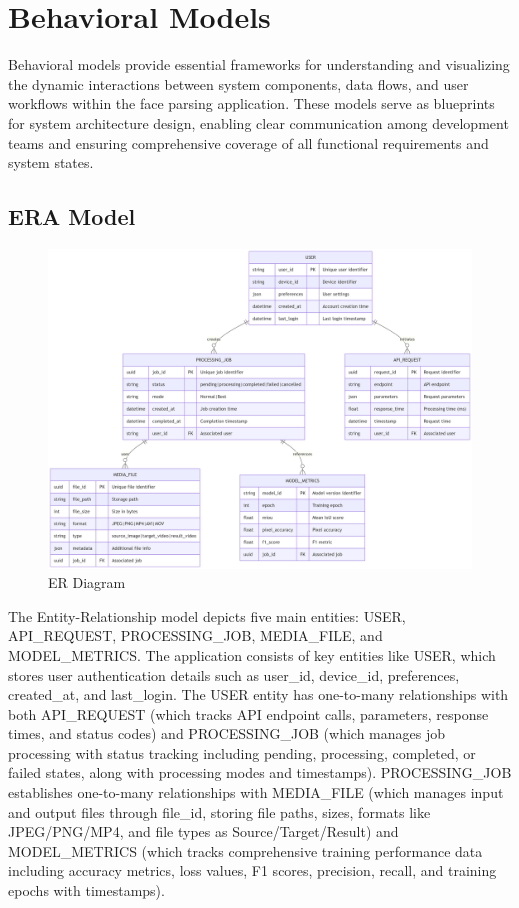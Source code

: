 \documentclass[12pt,a4paper]{report}
\begin{document}
\section{Behavioral Models}

Behavioral models provide essential frameworks for understanding and visualizing the dynamic interactions between system components, data flows, and user workflows within the face parsing application. These models serve as blueprints for system architecture design, enabling clear communication among development teams and ensuring comprehensive coverage of all functional requirements and system states.

\subsection{ERA Model}

\begin{figure}[H]
\centering
\includegraphics[width=1\textwidth]{figures/era_model_diagram.png}
\caption{ER Diagram}
\label{fig:er_diagram}
\end{figure}

The Entity-Relationship model depicts five main entities: USER, API\_REQUEST, PROCESSING\_JOB, MEDIA\_FILE, and MODEL\_METRICS. The application consists of key entities like USER, which stores user authentication details such as user\_id, device\_id, preferences, created\_at, and last\_login. The USER entity has one-to-many relationships with both API\_REQUEST (which tracks API endpoint calls, parameters, response times, and status codes) and PROCESSING\_JOB (which manages job processing with status tracking including pending, processing, completed, or failed states, along with processing modes and timestamps). PROCESSING\_JOB establishes one-to-many relationships with MEDIA\_FILE (which manages input and output files through file\_id, storing file paths, sizes, formats like JPEG/PNG/MP4, and file types as Source/Target/Result) and MODEL\_METRICS (which tracks comprehensive training performance data including accuracy metrics, loss values, F1 scores, precision, recall, and training epochs with timestamps).
\end{document}
